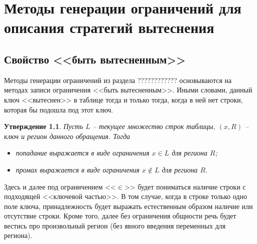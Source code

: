 \documentclass[14pt]{extreport}
\newtheorem{lemma}{Лемма}
\newtheorem{utv}{Утверждение}
\newtheorem*{sld}{Следствие}
\newcommand{\LRU}{\textsf{LRU}\xspace}
\begin{document}
%


\chapter{Методы генерации ограничений для описания стратегий вытеснения}

\section{Свойство <<быть вытесненным>>}

Методы генерации ограничений из раздела ???????????? основываются на методах
записи ограничения <<быть вытесненным>>. Иными словами, данный ключ <<вытеснен>>
в таблице тогда и только тогда, когда в ней нет строки, которая бы подошла под
этот ключ.

\begin{utv}\label{hit_miss_simpleform}
Пусть $L$ -- текущее множество строк таблицы, $(x,R)$ -- ключ и регион данного
обращения. Тогда
\begin{itemize}
\item попадание выражается в виде ограничения $x \in L$ для региона $R$;
\item промах выражается в виде ограничения $x \notin L$ для региона $R$.
\end{itemize}
\end{utv}

Здесь и далее под ограничением <<$\in$>> будет пониматься наличие строки с
подходящей <<ключевой частью>>. В том случае, когда в строке только одно поле
ключа, принадлежность будет выражать естественным образом наличие или отсутствие
строки. Кроме того, далее без ограничения общности речь будет вестись про
произвольный регион (без явного введения переменных для региона).
\end{document}
